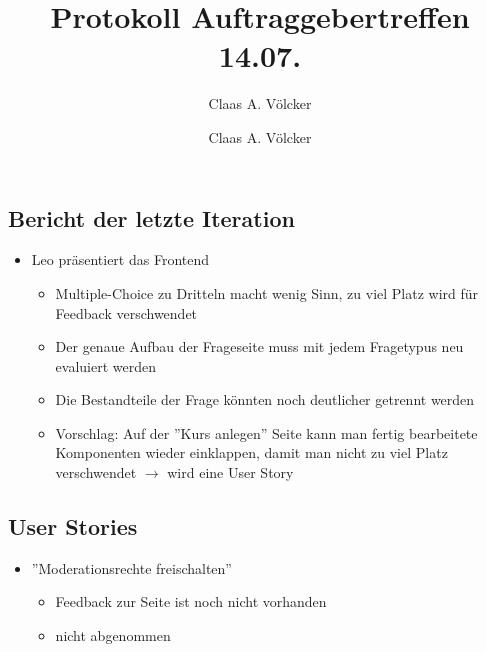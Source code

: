 \documentclass[colorback, accentcolor=tud1c, paper=a4]{tudexercise}
\title{Protokoll Auftraggebertreffen 14.07.}
\subtitle{Claas A. Völcker}
\author{Claas A. Völcker}
\begin{document}
	
\maketitle

\begin{multicols}{2}

\section{Bericht der letzte Iteration}
\begin{itemize}
	\item Leo präsentiert das Frontend
	\begin{itemize}
		\item Multiple-Choice zu Dritteln macht wenig Sinn, zu viel Platz wird für Feedback verschwendet
		\item Der genaue Aufbau der Frageseite muss mit jedem Fragetypus neu evaluiert werden
		\item Die Bestandteile der Frage könnten noch deutlicher getrennt werden
		\item Vorschlag: Auf der ''Kurs anlegen'' Seite kann man fertig bearbeitete Komponenten wieder einklappen, damit man nicht zu viel Platz verschwendet $\rightarrow$ wird eine User Story
	\end{itemize}
\end{itemize}

\subsection{User Stories}
\begin{itemize}
	\item ''Moderationsrechte freischalten''
	\begin{itemize}
		\item Feedback zur Seite ist noch nicht vorhanden
		\item nicht abgenommen
	\end{itemize}
\end{itemize}


\end{multicols}
\end{document}
